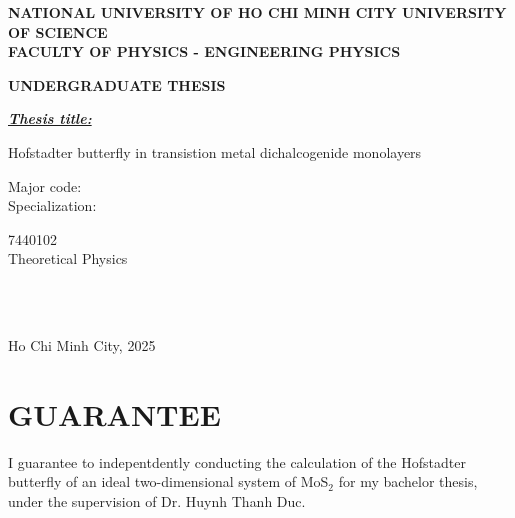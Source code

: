\documentclass{report}
\newcommand{\thesistitlee}{Hofstadter butterfly in transistion metal dichalcogenide monolayers}
\newcommand{\address}{NATIONAL UNIVERSITY OF HO CHI MINH CITY UNIVERSITY OF SCIENCE}
\newcommand{\department}{FACULTY OF PHYSICS - ENGINEERING PHYSICS}
\newcommand{\graddate}{Ho Chi Minh City, 2025}
\begin{document}
\begin{titlepage}
	\begin{center}
		{\bfseries

		{\large {\bf \address}}\\
		{{\textbf{\department}}}\\
		\vspace{2.5cm}

		{\large {\bf UNDERGRADUATE THESIS}}\\
		\vspace{3.0cm}

		}

	\end{center}
	\textit{\textbf{\underline{Thesis title:}}}\\
	\begin{center}
		{\bfseries

			{\largerrr\thesistitlee}
			\vspace{0.5in}

		}
	\end{center}
	\parbox{3cm}{Major code:\\ Specialization:}\parbox{5cm}{7440102\\Theoretical Physics}\\[1cm]
	\noindent
	\makebox[\textwidth]{\hfill\makebox[3in]{\hrulefill}}\\
	\begin{center}
	\end{center}
	\begin{center}
		\vspace{2.5in}
		{\graddate}
	\end{center}
\end{titlepage}

\newpage
{}
\pagestyle{fancy}
\renewcommand{\headrulewidth}{0pt}
\fancyhf{}
\fancyfoot[C]{\hspace{0cm} \thepage}
\setcounter{page}{1}

\chapter*{GUARANTEE}
I guarantee to indepentdently conducting the calculation of the Hofstadter butterfly of an ideal two-dimensional system of MoS$_{2}$ for my bachelor thesis, under the supervision of Dr. Huynh Thanh Duc.
\end{document}
